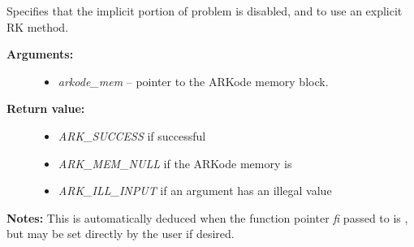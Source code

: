 \documentclass[letterpaper,10pt,english]{sphinxmanual}
\begin{document}
\begin{fulllineitems}
\label{c_interface/User_callable:c.ARKodeSetExplicit}
Specifies that the implicit portion of problem is disabled,
and to use an explicit RK method.
\begin{description}
\item[{\textbf{Arguments:}}] \leavevmode\begin{itemize}
\item {} 
\emph{arkode\_mem} -- pointer to the ARKode memory block.

\end{itemize}

\item[{\textbf{Return value:}}] \leavevmode\begin{itemize}
\item {} 
\emph{ARK\_SUCCESS} if successful

\item {} 
\emph{ARK\_MEM\_NULL} if the ARKode memory is 

\item {} 
\emph{ARK\_ILL\_INPUT} if an argument has an illegal value

\end{itemize}

\end{description}

\textbf{Notes:} This is automatically deduced when the function pointer \emph{fi}
passed to {\hyperref[c_interface/User_callable:c.ARKodeInit]{\emph{}}} is , but may be set
directly by the user if desired.

\end{fulllineitems}

\end{document}
